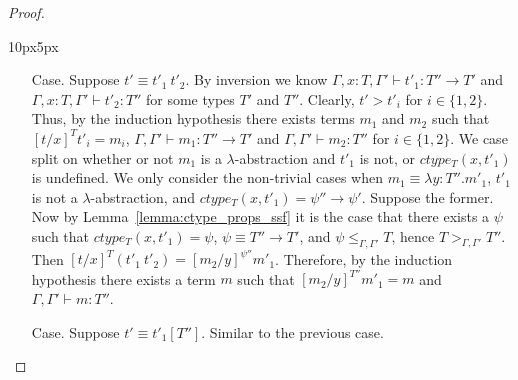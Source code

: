 \begin{proof}
\begin{changemargin}{10px}{5px}
\begin{itemize}
\item[Case.] Suppose $t' \equiv t'_1\ t'_2$.  By inversion we know
  $\Gamma, x:T, \Gamma' \vdash t'_1 : T'' \to T'$ and
  $\Gamma, x:T, \Gamma' \vdash t'_2 : T''$ for some types $T'$ and $T''$.
  Clearly, $t' > t'_i$ for $i \in \{1,2\}$.  Thus, by the induction hypothesis
  there exists terms $m_1$ and $m_2$ such that $[t/x]^T t'_i = m_i$,
  $\Gamma, \Gamma' \vdash m_1 : T'' \to T'$ and
  $\Gamma, \Gamma' \vdash m_2 : T''$ for
  $i \in \{1,2\}$.  We case split on whether or not $m_1$ is a $\lambda$-abstraction
  and $t'_1$ is not, or $ctype_T(x,t'_1)$ is undefined.  
  We only consider the non-trivial cases when 
  $m_1 \equiv \lambda y:T''.m'_1$, $t'_1$ is not a $\lambda$-abstraction, and 
  $ctype_T(x,t'_1) = \psi'' \to \psi'$.  Suppose the former.  
  Now by Lemma~\ref{lemma:ctype_props_ssf} it is the case that 
  there exists a $\psi$ such that $ctype_T(x,t'_1) = \psi$, 
  $\psi \equiv T'' \to T'$, and $\psi \leq_{\Gamma,\Gamma'} T$, hence
  $T >_{\Gamma,\Gamma'} T''$.
  Then $[t/x]^T (t'_1\ t'_2) = [m_2/y]^{\psi''} m'_1$.  
  Therefore, by the induction hypothesis there exists a 
  term $m$ such that $[m_2/y]^{T''} m'_1 = m$ and $\Gamma,\Gamma' \vdash m:T''$.
  
\item[Case.] Suppose $t' \equiv t'_1[T'']$. Similar to the previous
  case.  
\end{itemize}
\end{changemargin}
\end{proof}

